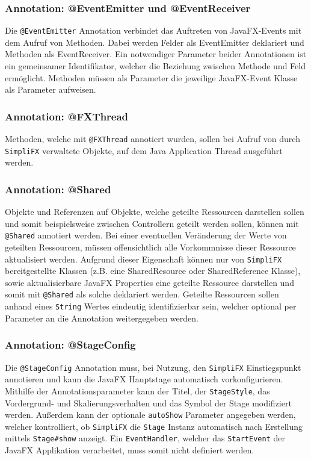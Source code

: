 \subsubsection{Annotation: @EventEmitter und @EventReceiver}
Die \texttt{@EventEmitter} Annotation verbindet das Auftreten von JavaFX-Events mit dem Aufruf von Methoden. Dabei werden Felder als EventEmitter deklariert und Methoden als EventReceiver. Ein notwendiger Parameter beider Annotationen ist ein gemeinsamer Identifikator, welcher die Beziehung zwischen Methode und Feld ermöglicht. Methoden müssen als Parameter die jeweilige JavaFX-Event Klasse als Parameter aufweisen.
\subsubsection{Annotation: @FXThread}
Methoden, welche mit \texttt{@FXThread} annotiert wurden, sollen bei Aufruf von durch \texttt{SimpliFX} verwaltete Objekte, auf dem Java Application Thread ausgeführt werden.
\subsubsection{Annotation: @Shared}
Objekte und Referenzen auf Objekte, welche geteilte Ressourcen darstellen sollen und somit beispielsweise zwischen Controllern geteilt werden sollen, können mit \texttt{@Shared} annotiert werden. Bei einer eventuellen Veränderung der Werte von geteilten Ressourcen, müssen offensichtlich alle Vorkommnisse dieser Ressource aktualisiert werden. Aufgrund dieser Eigenschaft können nur von \texttt{SimpliFX} bereitgestellte Klassen (z.B. eine SharedResource oder SharedReference Klasse), sowie aktualisierbare JavaFX Properties eine geteilte Ressource darstellen und somit mit \texttt{@Shared} als solche deklariert werden. Geteilte Ressourcen sollen anhand eines \texttt{String} Wertes eindeutig identifizierbar sein, welcher optional per Parameter an die Annotation weitergegeben werden.
\subsubsection{Annotation: @StageConfig}
Die \texttt{@StageConfig} Annotation muss, bei Nutzung, den \texttt{SimpliFX} Einstiegspunkt annotieren und kann die JavaFX Hauptstage automatisch vorkonfigurieren. Mithilfe der Annotationsparameter kann der Titel, der \texttt{StageStyle}, das Vordergrund- und Skalierungsverhalten und das Symbol der Stage modifiziert werden. Außerdem kann der optionale \texttt{autoShow} Parameter angegeben werden, welcher kontrolliert, ob \texttt{SimpliFX} die \texttt{Stage} Instanz automatisch nach Erstellung mittels \texttt{Stage\#show} anzeigt. Ein \texttt{EventHandler}, welcher das \texttt{StartEvent} der JavaFX Applikation verarbeitet, muss somit nicht definiert werden.
